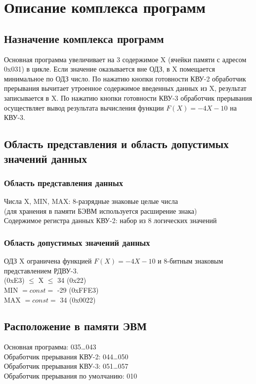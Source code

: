 \section{Описание комплекса программ}
\subsection{Назначение комплекса программ}
Основная программа увеличивает на 3 содержимое X (ячейки памяти с адресом 0x031) в цикле. Если значение оказывается вне ОДЗ, в X помещается минимальное по ОДЗ число. По нажатию кнопки готовности КВУ-2 обработчик прерывания вычитает утроенное содержимое введенных данных из X, результат записывается в X. По нажатию кнопки готовности КВУ-3 обработчик прерывания осуществляет вывод результата вычисления функции $F(X)=-4X-10$ на КВУ-3.

\subsection{Область представления и область допустимых значений данных}
\subsubsection{Область представления данных}
\noindent Числа X, MIN, MAX: 8-разрядные знаковые целые числа\\
(для хранения в памяти БЭВМ используется расширение знака)\\
Содержимое регистра данных КВУ-2: набор из 8 логических значений

\subsubsection{Область допустимых значений данных}
\noindent ОДЗ X ограничена функцией $F(X)=-4X-10$ и 8-битным знаковым представлением РДВУ-3.\\

 (0xE3) $\leqslant$ X $\leqslant$ 34 (0x22)\\
MIN $=const=$ -29 (0xFFE3)\\
MAX $=const=$ 34 (0x0022)

\subsection{Расположение в памяти ЭВМ}
\noindent Основная программа: 035\ldots043\\
Обработчик прерывания КВУ-2: 044\ldots050\\
Обработчик прерывания КВУ-3: 051\ldots057\\
Обработчик прерывания по умолчанию: 010\\

